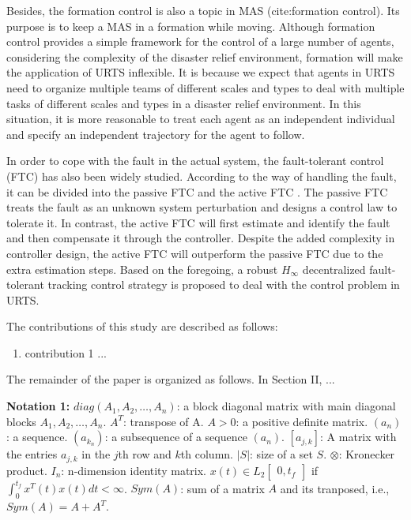\documentclass{ieeeaccess}
\begin{document}
Besides, the formation control is also a topic in MAS (cite:formation control). Its purpose is to keep a MAS in a formation while moving. Although formation control provides a simple framework for the control of a large number of agents, considering the complexity of the disaster relief environment, formation will make the application of URTS inflexible. It is because we expect that agents in URTS need to organize multiple teams of different scales and types to deal with multiple tasks of different scales and types in a disaster relief environment. In this situation, it is more reasonable to treat each agent as an independent individual and specify an independent trajectory for the agent to follow.

In order to cope with the fault in the actual system, the fault-tolerant control (FTC) has also been widely studied. According to the way of handling the fault, it can be divided into the passive FTC and the active FTC \cite{6669235}. The passive FTC treats the fault as an unknown system perturbation and designs a control law to tolerate it. In contrast, the active FTC will first estimate and identify the fault and then compensate it through the controller. Despite the added complexity in controller design, the active FTC will outperform the passive FTC due to the extra estimation steps. Based on the foregoing, a robust $H_\infty$ decentralized fault-tolerant tracking control strategy is proposed to deal with the control problem in URTS.

The contributions of this study are described as follows:
\begin{enumerate}
    \item contribution 1 ...
\end{enumerate}

The remainder of the paper is organized as follows. In Section II, ...

\textbf{Notation 1:} 
$diag(A_1, A_2, \dots, A_n)$: a block diagonal matrix with main diagonal blocks $A_1, A_2, \dots, A_n$. $A^T$: transpose of A. $A > 0$: a positive definite matrix. $(a_n)$: a sequence. $(a_{k_n})$: a subsequence of a sequence $(a_n)$. $[a_{j,k}]$: A matrix with the entries $a_{j,k}$ in the $j$th row and $k$th column. $\vert{S}\vert$: size of a set $S$. $\otimes$: Kronecker product. $I_n$: n-dimension identity matrix. $x(t)\in L_2\begin{bmatrix}
    0,t_f 
\end{bmatrix}$ if $\int^{t_f}_{0}x^T(t)x(t)dt<\infty$. $Sym(A)$: sum of a matrix $A$ and its tranposed, i.e., $Sym(A) = A+A^T$.
\end{document}
